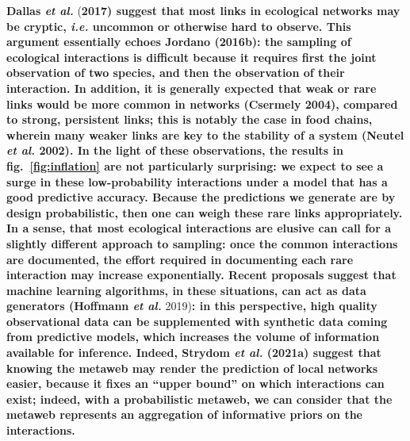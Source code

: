 \documentclass[11pt]{article}
\makeatletter
\def\maxwidth{\ifdim\Gin@nat@width>\linewidth\linewidth
\else\Gin@nat@width\fi}
\let\Oldincludegraphics\includegraphics
\renewcommand{\includegraphics}[1]{\Oldincludegraphics[width=\maxwidth]{#1}}
\providecommand{\DIFaddtex}[1]{{\bf #1}} %
\providecommand{\DIFdeltex}[1]{} %
\providecommand{\DIFaddbegin}{\protect\color{blue}} %
\providecommand{\DIFaddend}{\protect\color{black}} %
\providecommand{\DIFdelbegin}{\protect\color{red}} %
\providecommand{\DIFdelend}{\protect\color{black}} %
\providecommand{\DIFadd}[1]{\texorpdfstring{\DIFaddtex{#1}}{#1}} %
\providecommand{\DIFdel}[1]{\texorpdfstring{\DIFdeltex{#1}}{}} %
\newcommand{\DIFscaledelfig}{0.5}
\newlength{\DIFdelgraphicswidth} %
\newlength{\DIFdelgraphicsheight} %
\newcommand{\DIFaddincludegraphics}[2][]{{\color{blue}\fbox{\DIFOincludegraphics[#1]{#2}}}} %
\newcommand{\DIFdelincludegraphics}[2][]{%
\sbox{\DIFdelgraphicsbox}{\DIFOincludegraphics[#1]{#2}}%
\settoboxwidth{\DIFdelgraphicswidth}{\DIFdelgraphicsbox} %
\settoboxtotalheight{\DIFdelgraphicsheight}{\DIFdelgraphicsbox} %
\scalebox{\DIFscaledelfig}{%
\parbox[b]{\DIFdelgraphicswidth}{\usebox{\DIFdelgraphicsbox}\\[-\baselineskip] \rule{\DIFdelgraphicswidth}{0em}}\llap{\resizebox{\DIFdelgraphicswidth}{\DIFdelgraphicsheight}{%
\setlength{\unitlength}{\DIFdelgraphicswidth}%
\begin{picture}(1,1)%
\thicklines\linethickness{2pt} %
{\color[rgb]{1,0,0}\put(0,0){\framebox(1,1){}}}%
{\color[rgb]{1,0,0}\put(0,0){\line( 1,1){1}}}%
{\color[rgb]{1,0,0}\put(0,1){\line(1,-1){1}}}%
\end{picture}%
}\hspace*{3pt}}} %
} %
\DeclareRobustCommand{\DIFaddbegin}{\DIFOaddbegin \let\includegraphics\DIFaddincludegraphics} %
\DeclareRobustCommand{\DIFaddend}{\DIFOaddend \let\includegraphics\DIFOincludegraphics} %
\DeclareRobustCommand{\DIFdelbegin}{\DIFOdelbegin \let\includegraphics\DIFdelincludegraphics} %
\DeclareRobustCommand{\DIFdelend}{\DIFOaddend \let\includegraphics\DIFOincludegraphics} %
\makeatother
\begin{document}
\DIFdelbegin \DIFdel{Cirtwill \emph{et al.} }\DIFdelend \DIFaddbegin \DIFadd{Dallas \emph{et al.} }\DIFaddend (\DIFaddbegin \DIFadd{2017) suggest that most links in ecological
networks may be cryptic, \emph{i.e.} uncommon or otherwise hard to
observe. This argument essentially echoes Jordano (2016b): the sampling
of ecological interactions is difficult because it requires first the
joint observation of two species, and then the observation of their
interaction. In addition, it is generally expected that weak or rare
links would be more common in networks (Csermely 2004), compared to
strong, persistent links; this is notably the case in food chains,
wherein many weaker links are key to the stability of a system (Neutel
\emph{et al.} 2002). In the light of these observations, the results in
fig.~\ref{fig:inflation} are not particularly surprising: we expect to
see a surge in these low-probability interactions under a model that has
a good predictive accuracy. Because the predictions we generate are by
design probabilistic, then one can weigh these rare links appropriately.
In a sense, that most ecological interactions are elusive can call for a
slightly different approach to sampling: once the common interactions
are documented, the effort required in documenting each rare interaction
may increase exponentially. Recent proposals suggest that machine
learning algorithms, in these situations, can act as data generators
(Hoffmann \emph{et al.} }\DIFaddend 2019)\DIFdelbegin \DIFdel{previously made the point }\DIFdelend \DIFaddbegin \DIFadd{: in this perspective, high quality
observational data can be supplemented with synthetic data coming from
predictive models, which increases the volume of information available
for inference. Indeed, Strydom \emph{et al.} (2021a) suggest that
knowing the metaweb may render the prediction of local networks easier,
because it fixes an ``upper bound'' on which interactions can exist;
indeed, with a probabilistic metaweb, we can consider that the metaweb
represents an aggregation of informative priors on the interactions.
}
\end{document}
